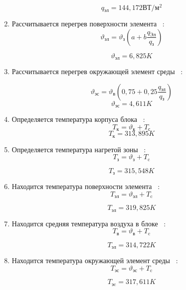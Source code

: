 \begin{enumerate}[label={\arabic*.}]
        $$q\mathrm{_{эл}} =144,172\mathrm{ВТ/м^2} $$

 \item Рассчитывается перегрев поверхности элемента ~\cite{Rotkop1976}:
 \begin{equation}
\vartheta\mathrm{_{эл}} = \vartheta\mathrm{_{з}}(a + b \frac{q\mathrm{_{Эл}}}{q\mathrm{_{з}}})
\end{equation}

$$\vartheta\mathrm{_{эл}} =6,825K$$

\item Рассчитывается перегрев окружающей элемент среды ~\cite{Rotkop1976}:

      \begin{equation}
      \vartheta\mathrm{_{эс}} = \vartheta\mathrm{_в}(0,75 + 0,25\frac{q\mathrm{_{эл}}}{q\mathrm{_{з}}})
    \end{equation}
    $$\vartheta\mathrm{_{эс}} = 4,611K$$

  \item Определяется температура корпуса блока ~\cite{Rotkop1976}:
    \begin{equation}
      T\mathrm{_к} = \vartheta\mathrm{_{к}} + T\mathrm{_с}
    \end{equation}
    $$T\mathrm{_{к}} = 313,895 K$$
    
\item Определяется температура нагретой зоны ~\cite{Rotkop1976}:
    \begin{equation}
      T\mathrm{_з} = \vartheta\mathrm{_з} + T\mathrm{_c}
    \end{equation}

    $$T\mathrm{_з} = 315,548 K$$
  \item Находится температура поверхности элемента ~\cite{Rotkop1976}:
    \begin{equation}
      T\mathrm{_{эл}} = \vartheta\mathrm{_{эл}} + T\mathrm{_c}
    \end{equation}

    $$T\mathrm{_{эл}} = 319,825 K$$

  \item Находится средняя температура воздуха в блоке ~\cite{Rotkop1976}:
    \begin{equation}
      T\mathrm{_{в}} = \vartheta\mathrm{_{в}} + T\mathrm{_c}
    \end{equation}

    $$T\mathrm{_{эл}} = 314,722 K$$

  \item Находится температура окружающей элемент среды ~\cite{Rotkop1976}:
    \begin{equation}
      T\mathrm{_{эс}} = \vartheta\mathrm{_{эс}} + T\mathrm{_c}
    \end{equation}

    $$T\mathrm{_{эc}} = 317,611 K$$
\end{enumerate}
